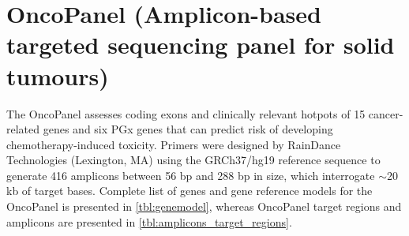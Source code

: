 \newpage
\section{OncoPanel (Amplicon-based targeted sequencing panel for solid tumours)}
\label{sec:OncoPanel}

The OncoPanel assesses coding exons and clinically relevant hotpots of 15 cancer-related genes and six PGx genes that can predict risk of developing chemotherapy-induced toxicity. Primers were designed by RainDance Technologies (Lexington, MA) using the GRCh37/hg19 reference sequence to generate 416 amplicons between 56 bp and 288 bp in size, which interrogate $\sim$20 kb of target bases. Complete list of genes and gene reference models for the OncoPanel is presented in \autoref{tbl:genemodel}, whereas OncoPanel target regions and amplicons are presented in \autoref{tbl:amplicons_target_regions}.

